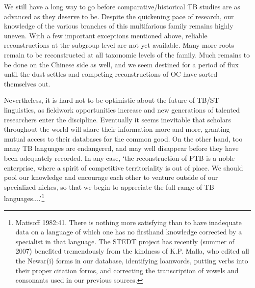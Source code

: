 We still have a long way to go before comparative/historical TB studies are
as advanced as they deserve to be.  Despite the quickening pace of research, our
knowledge of the various branches of this multifarious family remains highly
uneven. With a few important exceptions mentioned above, reliable
reconstructions at the subgroup level are not yet available.  Many more roots
remain to be reconstructed at all taxonomic levels of the family. Much remains
to be done on the Chinese side as well, and we seem destined for a period of
flux until the dust settles and competing reconstructions of OC have sorted
themselves out.


Nevertheless, it is hard not to be optimistic about the future of TB/ST
linguistics, as fieldwork opportunities increase and new generations of talented
researchers enter the discipline. Eventually it seems inevitable that scholars
throughout the world will share their information more and more, granting mutual
access to their databases for the common good. On the other hand, too many TB
languages are endangered, and may well disappear before they have been
adequately recorded. In any case, ‘the reconstruction of PTB is a noble
enterprise, where a spirit of competitive territoriality is out of place. We
should pool our knowledge and encourage each other to venture outside of our
specialized niches, so that we begin to appreciate the full range of TB
languages....’\footnote{Matisoff 1982:41.  There is nothing more satisfying
than to have inadequate data on a language of which one has no firsthand
knowledge corrected by a specialist in that language.  The STEDT project
has recently (summer of 2007) benefited tremendously from the kindness of K.P.
Malla, who edited all the Newar(i) forms in our database, identifying loanwords,
putting verbs into their proper citation forms, and correcting the transcription
of vowels and consonants used in our previous sources.}



